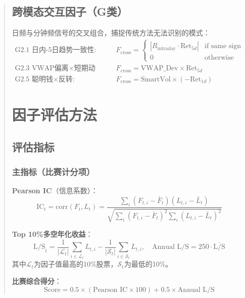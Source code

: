 \documentclass[12pt,a4paper]{article}
\begin{document}
\begin{abstract}
\subsection{跨模态交互因子（G类）}

日频与分钟频信号的交叉组合，捕捉传统方法无法识别的模式：
\begin{align}
    \text{G2.1 日内-5日趋势一致性:} &\quad F_{\text{cross}} = \begin{cases} |R_{\text{intraday}} \cdot \text{Ret}_{5d}| & \text{if same sign} \\ 0 & \text{otherwise} \end{cases} \\
    \text{G2.3 VWAP偏离×短期动量:} &\quad F_{\text{cross}} = \text{VWAP\_Dev} \times \text{Ret}_{5d} \\
    \text{G2.5 聪明钱×反转:} &\quad F_{\text{cross}} = \text{SmartVol} \times (-\text{Ret}_{1d})
\end{align}

\section{因子评估方法}

\subsection{评估指标}

\subsubsection{主指标（比赛计分项）}

\textbf{Pearson IC}（信息系数）：
\begin{equation}
    \text{IC}_t = \text{corr}(F_t, L_t) = \frac{\sum_i (F_{t,i} - \bar{F}_t)(L_{t,i} - \bar{L}_t)}{\sqrt{\sum_i (F_{t,i} - \bar{F}_t)^2 \sum_i (L_{t,i} - \bar{L}_t)^2}}
\end{equation}

\textbf{Top 10\%多空年化收益}：
\begin{equation}
    \text{L/S}_t = \frac{1}{|\mathcal{L}_t|}\sum_{i \in \mathcal{L}_t} L_{t,i} - \frac{1}{|\mathcal{S}_t|}\sum_{i \in \mathcal{S}_t} L_{t,i}, \quad \text{Annual L/S} = 250 \cdot \overline{\text{L/S}}
\end{equation}
其中$\mathcal{L}_t$为因子值最高的10\%股票，$\mathcal{S}_t$为最低的10\%。

\textbf{比赛综合得分}：
\begin{equation}
    \text{Score} = 0.5 \times (\text{Pearson IC} \times 100) + 0.5 \times \text{Annual L/S}
\end{equation}


\end{abstract}
\end{document}
